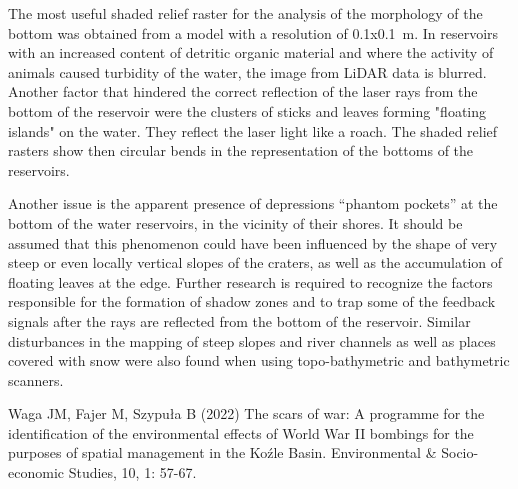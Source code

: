 {The most useful shaded relief raster for the analysis of the morphology of the bottom was obtained from a model with a resolution of 0.1x0.1~m. In reservoirs with an increased content of detritic organic material and where the activity of animals caused turbidity of the water, the image from LiDAR data is blurred. Another factor that hindered the correct reflection of the laser rays from the bottom of the reservoir were the clusters of sticks and leaves forming "floating islands" on the water. They reflect the laser light like a roach. The shaded relief rasters show then circular bends in the representation of the bottoms of the reservoirs.

Another issue is the apparent presence of depressions \enquote{phantom pockets} at the bottom of the water reservoirs, in the vicinity of their shores. It should be assumed that this phenomenon could have been influenced by the shape of very steep or even locally vertical slopes of the craters, as well as the accumulation of floating leaves at the edge. Further research is required to recognize the factors responsible for the formation of shadow zones and to trap some of the feedback signals after the rays are reflected from the bottom of the reservoir. Similar disturbances in the mapping of steep slopes and river channels as well as places covered with snow were also found when using topo-bathymetric and bathymetric scanners.
}
{Waga JM, Fajer M, Szypuła B (2022) The scars of war: A programme for the identification of the environmental effects of World War II bombings for the purposes of spatial management in the Koźle Basin. Environmental \& Socio-economic Studies, 10, 1: 57-67.
}




